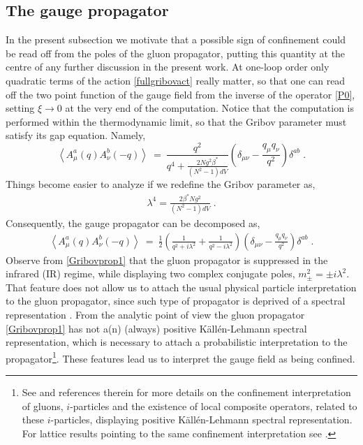 \subsection{The gauge propagator}
\label{A sign of confinement from gluon propagator}


In the present subsection we motivate that a possible sign of confinement could be read off
from the poles of the gluon propagator, putting this quantity at the centre of any further
discussion in the present work. At one-loop order only quadratic terms of the action
\eqref{fullgribovact} really matter, so that one can read off the two point function of the
gauge field from the inverse of the operator \eqref{P0}, setting $\xi \to 0$ at the very end of
the computation. Notice that the computation is performed within the thermodynamic limit, so
that the Gribov parameter must satisfy its gap equation. Namely,
\begin{equation}
\left\langle A_{\mu }^{a}(q)A_{\nu}^{b}(-q)\right\rangle ~=~ \frac{q^{2}}{q^{4}  +  \frac{2N
g^{2}\beta^{\ast} }{(N^{2}-1)dV} } \left( \delta _{\mu \nu }  -  \frac{q_{\mu }q_{\nu}}{q^{2}}
\right)\delta^{ab}  \;.
\label{Gribovprop0}
\end{equation}
Things become easier to analyze if we redefine the Gribov parameter as,
\begin{eqnarray}
\lambda^{4} = \frac{2\beta^{\ast} N g^2}{(N^2 - 1)dV}\;.
\end{eqnarray}
Consequently, the gauge propagator can be decomposed as,
\begin{eqnarray}
\left\langle A_{\mu }^{a}(q)A_{\nu}^{b}(-q)\right\rangle 
~=~ \frac{1}{2} \left( \frac{1}{q^{2}  +  i \lambda^{2} } +  \frac{1}{q^{2}  -  i \lambda^{2} }
\right)  \left( \delta _{\mu \nu }  -  \frac{q_{\mu }q_{\nu}}{q^{2}}  \right)\delta^{ab}\;.
\label{Gribovprop1}
\end{eqnarray}
Observe from \eqref{Gribovprop1} that the gluon propagator is suppressed in the infrared (IR)
regime, while displaying two complex conjugate poles, $m^{2}_{\pm} = \pm i\lambda^{2}$. That
feature does not allow us to attach the usual physical particle interpretation to the gluon
propagator, since such type of propagator is deprived of a spectral representation
\cite{Cucchieri:2007rg,Cucchieri:2008fc,Cucchieri:2011ig,Cucchieri:2004mf,Cucchieri:2014via}.
From the analytic point of view the gluon propagator \eqref{Gribovprop1} has not
a(n) (always) positive K\"{a}ll\'en-Lehmann spectral representation, which is necessary to
attach a probabilistic interpretation to the propagator\footnote{ See
\cite{Baulieu:2009ha,Sorella:2010it} and references therein for more details on the confinement
interpretation of gluons, $i$-particles and the existence of local composite operators, related
to these $i$-particles, displaying positive K\"{a}ll\'en-Lehmann spectral representation. For
lattice results pointing to the same confinement interpretation see
\cite{Cucchieri:2007rg,Cucchieri:2008fc,Cucchieri:2011ig,Cucchieri:2004mf,Cucchieri:2014via}.}.
These features lead us to interpret the gauge field as being confined.

